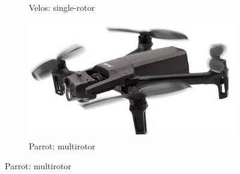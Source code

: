 \begin{figure}[htb!]
\begin{subfigure}[t]{.32\textwidth}
    \caption{Velos: single-rotor~\cite{velosDrone}}
    \label{fig:uav-single-rotor}
  \end{subfigure}\hfill
  \begin{subfigure}[t]{.32\textwidth}\centering
    \includegraphics[width=\linewidth]{./img/jpg/uav-parrot-multirotor.jpg}
    \caption{Parrot: multirotor~\cite{parrotDrone}}
    \label{fig:uav-multirotor}
  \end{subfigure}

  \medskip %


\end{figure}
